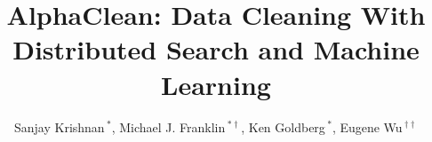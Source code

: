\documentclass{sig-alternate}
\begin{document}
\newcommand{\reminder}[1]{{{\textcolor{magenta}{\{\{\bf #1\}\}}}\xspace}}
\newcommand{\ewu}[1]{{{\textcolor{blue}{\{\{\bf ewu:\} #1\}}}\xspace}}
\newcommand{\mps}[1]{{{\textcolor{red}{\{\{\bf meelap:\} #1\}}}\xspace}}
\newcommand{\stitle}[1]{\smallskip\noindent\textbf{#1: }}
\newcommand{\ititle}[1]{\smallskip\noindent\textit{#1: }}
\newcommand{\btitle}[1]{\smallskip\noindent\textbf{#1}}



\newcommand{\white}[1]{{\textcolor{white}{#1}\xspace}}
\newcommand{\blue}[1]{{\textcolor{blue}{{\bf #1}}\xspace}}
\newcommand{\orange}[1]{{\textcolor{orange}{{\bf #1}}\xspace}}
\newcommand{\pop}[1]{{\textcolor{pop}{{\textit{\textbf{#1}}}}\xspace}}
\newcommand{\red}[1]{\textcolor{red}{#1}}
\newcommand{\green}[1]{\textcolor{green}{#1}}
\newcommand{\gray}[1]{\textcolor{light-gray}{#1}}




\newcommand{\specialcell}[2][c]{%
  \begin{tabular}[#1]{@{}c@{}}#2\end{tabular}}

\def\ojoin{\setbox0=\hbox{$\bowtie$}%
  \rule[-.02ex]{.25em}{.4pt}\llap{\rule[\ht0]{.25em}{.4pt}}}
\def\leftouterjoin{\mathbin{\ojoin\mkern-5.8mu\bowtie}}
\def\rightouterjoin{\mathbin{\bowtie\mkern-5.8mu\ojoin}}
\def\fullouterjoin{\mathbin{\ojoin\mkern-5.8mu\bowtie\mkern-5.8mu\ojoin}}


\pagestyle{plain}

%

\title{AlphaClean: Data Cleaning With Distributed Search and Machine Learning}

\author{ Sanjay Krishnan$\,^{*}$, Michael J. Franklin$\,^{*\dag}$, Ken Goldberg$\,^{*}$, Eugene Wu{$\,^{\dag\dag}$}  \\
 \\
\\
\affaddr{}
}
\end{document}
